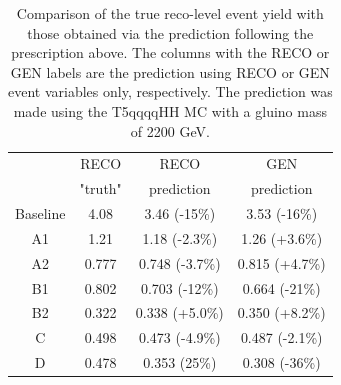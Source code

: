\begin{table}
\centering
\caption{
Comparison of the true reco-level event yield with those obtained via the prediction following the prescription above.
The columns with the RECO or GEN labels are the prediction using RECO or GEN event variables only, respectively.
The prediction was made using the T5qqqqHH MC with a gluino mass of 2200 GeV.
}
\begin{tabular}{c | c c c}
\hline\hline
         & RECO     & RECO           & GEN\\
         & "truth"  & prediction     & prediction\\
\hline
Baseline & 4.08     & 3.46 (-15\%)   & 3.53 (-16\%)\\
A1       & 1.21     & 1.18 (-2.3\%)  & 1.26 (+3.6\%)\\
A2       & 0.777    & 0.748 (-3.7\%) & 0.815 (+4.7\%)\\
B1       & 0.802    & 0.703 (-12\%)  & 0.664 (-21\%)\\
B2       & 0.322    & 0.338 (+5.0\%) & 0.350 (+8.2\%)\\
C        & 0.498    & 0.473 (-4.9\%) & 0.487 (-2.1\%)\\
D        & 0.478    & 0.353 (25\%)   & 0.308 (-36\%)\\
\hline\hline
\end{tabular}
\label{tab:predclos}
\end{table}

